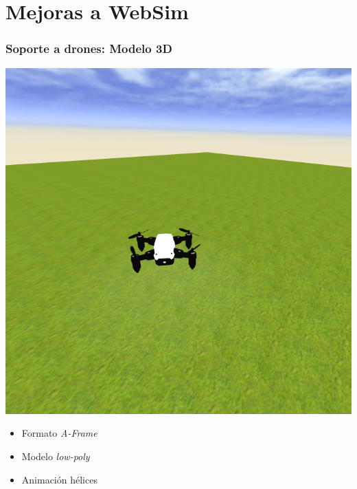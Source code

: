 \documentclass[xcolor={table}]{beamer}
\begin{document}
	\section{Mejoras a WebSim}


    	\begin{frame}
			\frametitle{Soporte a drones: Modelo 3D}
      \begin{minipage}{.48\textwidth}
      \includegraphics[scale=0.25]{img/WebsimDrone.png}
        \end{minipage}
      \begin{minipage}{.50\textwidth}
      \begin{itemize}
      \begin{itemize}{}\itemsep5pt
          \item Formato \textit{A-Frame}
          \item Modelo \textit{low-poly}
          \item Animación hélices
          \end{itemize}
      \end{itemize}
    \end{minipage}
    	\end{frame}
\end{document}
